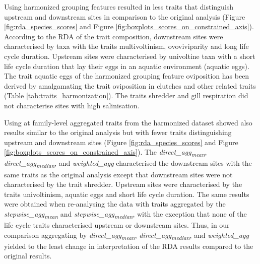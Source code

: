\documentclass{article}
\begin{document}
Using harmonized grouping features resulted in less traits that distinguish upstream and downstream sites in comparison to the original analysis (Figure \ref{fig:rda_species_scores} and Figure \ref{fig:boxplots_scores_on_constrained_axis}). According to the RDA of the trait composition, downstream sites were characterised by taxa with the traits multivoltinism, ovoviviparity and long life cycle duration. Upstream sites were characterised by univoltine taxa with a short life cycle duration that lay their eggs in an aquatic environment (aquatic eggs). The trait aquatic eggs of the harmonized grouping feature oviposition has been derived by amalgamating the trait oviposition in clutches and other related traits (Table \ref{tab:traits_harmonization}). The traits shredder and gill respiration did not characterise sites with high salinisation.

Using at family-level aggregated traits from the harmonized dataset showed also results similar to the original analysis but with fewer traits distinguishing upstream and downstream sites (Figure \ref{fig:rda_species_scores} and Figure \ref{fig:boxplots_scores_on_constrained_axis}). The \textit{direct\_agg\textsubscript{mean}}, \textit{direct\_agg\textsubscript{median}}, and \textit{weighted\_agg} 
characterised the downstream sites with the same traits as the original analysis except that downstream sites were not characterised by the trait shredder. Upstream sites were characterised by the traits univoltinism, aquatic eggs and short life cycle duration. The same results were obtained when re-analysing the data with traits aggregated by the \textit{stepwise\_agg\textsubscript{mean}} and \textit{stepwise\_agg\textsubscript{median}}, with the exception that none of the life cycle traits characterised upstream or downstream sites. Thus, in our comparison aggregating by \textit{direct\_agg\textsubscript{mean}}, \textit{direct\_agg\textsubscript{median}}, and \textit{weighted\_agg} yielded to the least change in interpretation of the RDA results compared to the original results.
\end{document}
